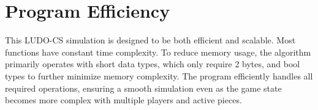 \documentclass{article}
\begin{document}
\section{Program Efficiency}
This LUDO-CS simulation is designed to be both efficient and scalable. Most functions have constant time complexity. To reduce memory usage, the algorithm primarily operates with short data types, which only require 2 bytes, and bool types to further minimize memory complexity. The program efficiently handles all required operations, ensuring a smooth simulation even as the game state becomes more complex with multiple players and active pieces.
\end{document}
